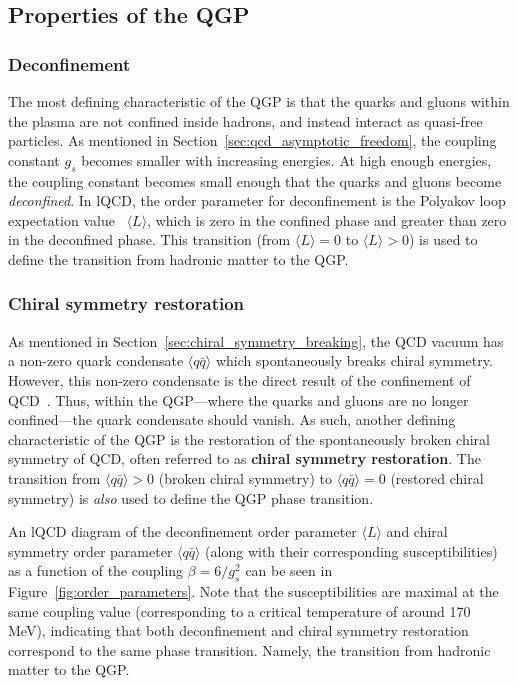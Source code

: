 \subsection{Properties of the QGP}
\label{sec:qgp_properties}

\subsubsection{Deconfinement}

The most defining characteristic of the QGP is that the quarks and gluons within the plasma are not confined inside hadrons, and instead interact as quasi-free particles. As mentioned in Section~\ref{sec:qcd_asymptotic_freedom}, the coupling constant $g_s$ becomes smaller with increasing energies. At high enough energies, the coupling constant becomes small enough that the quarks and gluons become \textit{deconfined}. In lQCD, the order parameter for deconfinement is the Polyakov loop expectation value~\cite{PolyakovLoop} $\langle L \rangle$, which is zero in the confined phase and greater than zero in the deconfined phase. This transition (from $\langle L \rangle = 0$ to $\langle L \rangle > 0$) is used to define the transition from hadronic matter to the QGP. 


\subsubsection{Chiral symmetry restoration}

As mentioned in Section~\ref{sec:chiral_symmetry_breaking}, the QCD vacuum has a non-zero quark condensate $\langle q\bar{q} \rangle$ which spontaneously breaks chiral symmetry. However, this non-zero condensate is the direct result of the confinement of QCD~\cite{TongGaugeTheory}. Thus, within the QGP---where the quarks and gluons are no longer confined---the quark condensate should vanish. As such, another defining characteristic of the QGP is the restoration of the spontaneously broken chiral symmetry of QCD, often referred to as \textbf{chiral symmetry restoration}. The transition from $\langle q\bar{q} \rangle > 0$ (broken chiral symmetry) to $\langle q\bar{q} \rangle = 0$ (restored chiral symmetry) is \textit{also} used to define the QGP phase transition. 

An lQCD diagram of the deconfinement order parameter $\langle L \rangle$ and chiral symmetry order parameter $\langle q\bar{q} \rangle$ (along with their corresponding susceptibilities) as a function of the coupling $\beta = 6/g_s^2$ can be seen in Figure~\ref{fig:order_parameters}. Note that the susceptibilities are maximal at the same coupling value (corresponding to a critical temperature of around 170 MeV), indicating that both deconfinement and chiral symmetry restoration correspond to the same phase transition. Namely, the transition from hadronic matter to the QGP.

